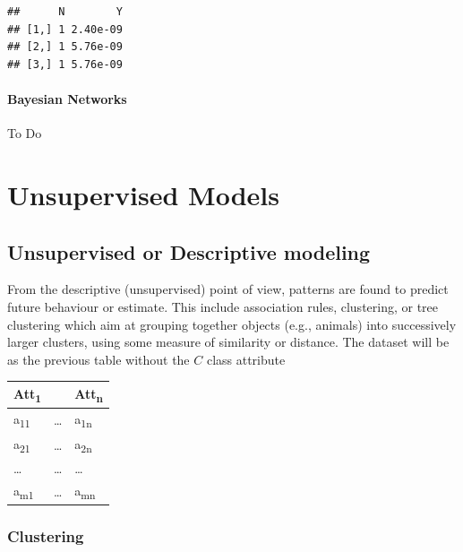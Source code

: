 \documentclass[]{book}
\begin{document}
\begin{verbatim}
##      N        Y
## [1,] 1 2.40e-09
## [2,] 1 5.76e-09
## [3,] 1 5.76e-09
\end{verbatim}

\subsection{Bayesian Networks}\label{bayesian-networks}

To Do

\part{Unsupervised Models}\label{part-unsupervised-models}

\chapter{Unsupervised or Descriptive
modeling}\label{unsupervised-or-descriptive-modeling}

From the descriptive (unsupervised) point of view, patterns are found to
predict future behaviour or estimate. This include association rules,
clustering, or tree clustering which aim at grouping together objects
(e.g., animals) into successively larger clusters, using some measure of
similarity or distance. The dataset will be as the previous table
without the \(C\) class attribute

\begin{longtable}[]{@{}lll@{}}
\toprule
Att\textsubscript{1} & & Att\textsubscript{n}\tabularnewline
\midrule
\endhead
a\textsubscript{11} & \ldots{} & a\textsubscript{1n}\tabularnewline
a\textsubscript{21} & \ldots{} & a\textsubscript{2n}\tabularnewline
\ldots{} & \ldots{} & \ldots{}\tabularnewline
a\textsubscript{m1} & \ldots{} & a\textsubscript{mn}\tabularnewline
\bottomrule
\end{longtable}

\section{Clustering}\label{clustering}
\end{document}
